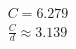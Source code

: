 \documentclass[preview]{standalone}
\begin{document}
\begin{align*}
C = 6.279 \\\frac{C}{d} \approx 3.139
\end{align*}
\end{document}
